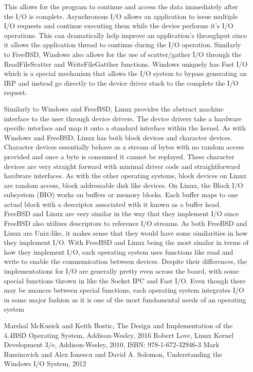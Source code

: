 \documentclass[letterpaper,10pt,draftclsnofoot,onecolumn,titlepage]{IEEEtran}
\begin{document}
		This allows for the program to continue and access the data immediately after the I/O is complete.
		Asynchronous I/O allows an application to issue multiple I/O requests and continue executing them while the device performs it's I/O operations.
		This can dramatically help improve an application's throughput since it allows the application thread to continue during the I/O operation.
		Similarly to FreeBSD, Windows also allows for the use of scatter/gather I/O through the ReadFileScatter and WriteFileGatther functions.
		Windows uniquely has Fast I/O which is a special mechanism that allows the I/O system to bypass generating an IRP and instead go directly to the device driver stack to the complete the I/O request.

		Similarly to Windows and FreeBSD, Linux provides the abstract machine interface to the user through device drivers.
		The device drivers take a hardware specific interface and map it onto a standard interface within the kernel.
		As with Windows and FreeBSD, Linux has both block devices and character devices.
		Character devices essentially behave as a stream of bytes with no random access provided and once a byte is consumed it cannot be replayed. \cite{Linux}
		These character devices are very straight forward with minimal driver code and straightforward hardware interfaces.
		As with the other operating systems, block devices on Linux are random access, block addressable disk like devices.
		On Linux, the Block I/O subsystem (BIO) works on buffers or memory blocks.
		Each buffer maps to one actual block with a descriptor associated with it known as a buffer head.
		FreeBSD and Linux are very similar in the way that they implement I/O since FreeBSD also utilizes descriptors to reference I/O streams.
		As both FreeBSD and Linux are Unix-like, it makes sense that they would have some similarities in how they implement I/O.
		With FreeBSD and Linux being the most similar in terms of how they implement I/O, each operating system uses functions like read and write to enable the communication between devices.
		Despite their differences, the implementations for I/O are generally pretty even across the board, with some special functions thrown in like the Socket IPC and Fast I/O.
		Even though there may be nuances between special functions, each operating system integrates I/O in some major fashion as it is one of the most fundamental needs of an operating system


	\clearpage

	\begin{thebibliography}{3}
			Marshal McKusick and Keith Bostic,
			The Design and Implementation of the 4.4BSD Operating System,
			Addison-Wesley,
			2016
			Robert Love,
			Linux Kernel Development 3/e,
			Addison-Wesley,
			2010,
			ISBN: 978-1-672-32946-3
			Mark Russinovich and Alex Ionescu and David A. Solomon,
			Understanding the Windows I/O System,
			2012
	\end{thebibliography}
\end{document}
